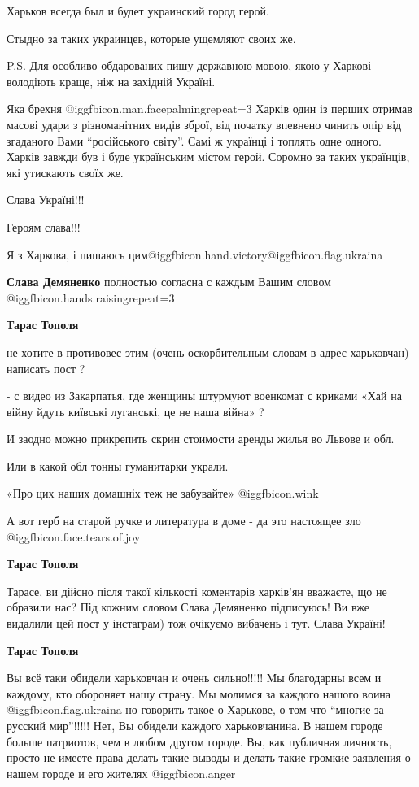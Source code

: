 \begin{itemize}
\begin{itemize}
Харьков всегда был и будет украинский город герой.

Стыдно за таких украинцев, которые ущемляют своих же.

P.S. Для особливо обдарованих пишу державною мовою, якою у Харкові володіють краще, ніж на західній Україні.

Яка брехня  @igg{fbicon.man.facepalming}{repeat=3}  Харків один із перших отримав масові удари з різноманітних
видів зброї, від початку впевнено чинить опір від згаданого Вами \enquote{російського
світу}. Самі ж українці і топлять одне одного. Харків завжди був і буде
українським містом герой. Соромно за таких українців, які утискають своїх же.

Слава Україні!!!

Героям слава!!!

Я з Харкова, і пишаюсь цим@igg{fbicon.hand.victory}@igg{fbicon.flag.ukraina}

\textbf{Слава Демяненко} полностью согласна с каждым Вашим словом @igg{fbicon.hands.raising}{repeat=3} 

\textbf{Тарас Тополя} 

не хотите в противовес этим (очень оскорбительным словам в адрес харьковчан)
написать пост ?

- с видео из Закарпатья, где женщины штурмуют военкомат с криками «Хай на війну
йдуть київські луганські, це не наша війна» ?

И заодно можно прикрепить скрин стоимости аренды жилья во Львове и обл.

Или в какой обл тонны гуманитарки украли.

«Про цих наших домашніх теж не забувайте» @igg{fbicon.wink} 

А вот герб на старой ручке и литература в доме - да это настоящее зло @igg{fbicon.face.tears.of.joy} 

\textbf{Тарас Тополя} 

Тарасе, ви дійсно після такої кількості коментарів харків’ян вважаєте, що не
образили нас? Під кожним словом Слава Демяненко підписуюсь! Ви вже видалили цей
пост у інстаграм) тож очікуємо вибачень і тут. Слава Україні!

\textbf{Тарас Тополя} 

Вы всё таки обидели харьковчан и очень сильно!!!!! Мы благодарны всем и
каждому, кто обороняет нашу страну. Мы молимся за каждого нашого воина @igg{fbicon.flag.ukraina} но
говорить такое о Харькове, о том что \enquote{многие за русский мир}!!!!! Нет, Вы
обидели каждого харьковчанина. В нашем городе больше патриотов, чем в любом
другом городе. Вы, как публичная личность, просто не имеете права делать такие
выводы и делать такие громкие заявления о нашем городе и его жителях @igg{fbicon.anger} 


\end{itemize}
\end{itemize}
